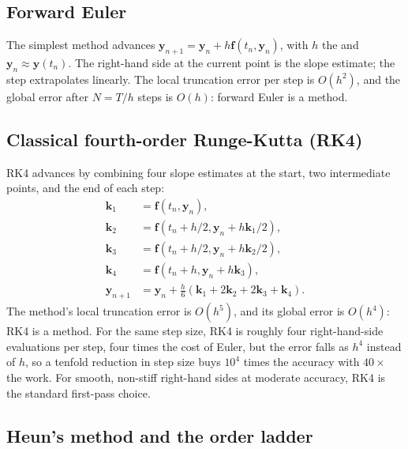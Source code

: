 \subsection{Forward Euler}

The simplest method advances $\mathbf{y}_{n+1} = \mathbf{y}_{n} + h
\mathbf{f}(t_{n}, \mathbf{y}_{n})$, with $h$ the  and $\mathbf{y}_{n} \approx \mathbf{y}(t_{n})$. The
right-hand side at the current point is the slope estimate; the
step extrapolates linearly. The local truncation error per step is
$O(h^{2})$, and the global error after $N = T/h$ steps is $O(h)$:
forward Euler is a  method.

\subsection{Classical fourth-order Runge-Kutta (RK4)}

RK4 advances by combining four slope estimates at the start, two
intermediate points, and the end of each step:
\[
\begin{aligned}
\mathbf{k}_{1} &= \mathbf{f}(t_{n}, \mathbf{y}_{n}), \\
\mathbf{k}_{2} &= \mathbf{f}(t_{n} + h/2, \mathbf{y}_{n} + h\mathbf{k}_{1}/2), \\
\mathbf{k}_{3} &= \mathbf{f}(t_{n} + h/2, \mathbf{y}_{n} + h\mathbf{k}_{2}/2), \\
\mathbf{k}_{4} &= \mathbf{f}(t_{n} + h, \mathbf{y}_{n} + h\mathbf{k}_{3}), \\
\mathbf{y}_{n+1} &= \mathbf{y}_{n} + \frac{h}{6}(\mathbf{k}_{1} + 2\mathbf{k}_{2} + 2\mathbf{k}_{3} + \mathbf{k}_{4}).
\end{aligned}
\]
The method's local truncation error is $O(h^{5})$, and its global
error is $O(h^{4})$: RK4 is a  method. For
the same step size, RK4 is roughly four right-hand-side
evaluations per step, four times the cost of Euler, but the error
falls as $h^{4}$ instead of $h$, so a tenfold reduction in step
size buys $10^{4}$ times the accuracy with $40\times$ the work.
For smooth, non-stiff right-hand sides at moderate accuracy, RK4 is
the standard first-pass choice.

\subsection{Heun's method and the order ladder}


